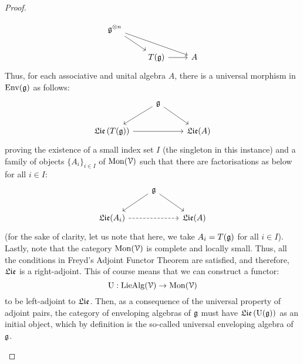 \begin{proof}
\begin{enumerate}
                            $$
                                \begin{tikzcd}
                                	{\g^{\tensor n}} \\
                                	& {T(\g)} & {A}
                                	\arrow[from=1-1, to=2-2]
                                	\arrow[from=2-2, to=2-3]
                                	\arrow[from=1-1, to=2-3]
                                \end{tikzcd}
                            $$
                        Thus, for each associative and unital algebra $A$, there is a universal morphism in $\mathrm{Env}(\mathfrak{g})$ as follows:
                            $$
                                \begin{tikzcd}
                                	& {\g} \\
                                	{\frakLie\left(T(\g)\right)} && {\frakLie(A)}
                                	\arrow[from=2-1, to=2-3]
                                	\arrow[from=1-2, to=2-1]
                                	\arrow[from=1-2, to=2-3]
                                \end{tikzcd}
                            $$
                        proving the existence of a small index set $I$ (the singleton in this instance) and a family of objects $\{A_i\}_{i \in I}$ of $\mathrm{Mon}(\mathcal{V})$ such that there are factorisations as below for all $i \in I$:
                            $$
                                \begin{tikzcd}
                                	& {\g} \\
                                	{\frakLie(A_i)} && {\frakLie(A)}
                                	\arrow[from=2-1, to=2-3, dashed]
                                	\arrow["{}"', from=1-2, to=2-1]
                                	\arrow["{}", from=1-2, to=2-3]
                                \end{tikzcd}
                            $$
                        (for the sake of clarity, let us note that here, we take $A_i = T(\mathfrak{g})$ for all $i \in I$). Lastly, note that the category $\mathrm{Mon}(\mathcal{V})$ is complete and locally small. Thus, all the conditions in Freyd's Adjoint Functor Theorem are satisfied, and therefore, $\mathfrak{Lie}$ is a right-adjoint. This of course means that we can construct a functor:
                            $$\mathrm{U}: \mathrm{Lie}\mathrm{Alg}(\mathcal{V}) \to \mathrm{Mon}(\mathcal{V})$$
                        to be left-adjoint to $\mathfrak{Lie}$. Then, as a consequence of the universal property of adjoint pairs, the category of enveloping algebras of $\mathfrak{g}$ must have $\mathfrak{Lie}\left(\mathrm{U}(\mathfrak{g})\right)$ as an initial object, which by definition is the so-called universal enveloping algebra of $\mathfrak{g}$.

\end{enumerate}
\end{proof}
